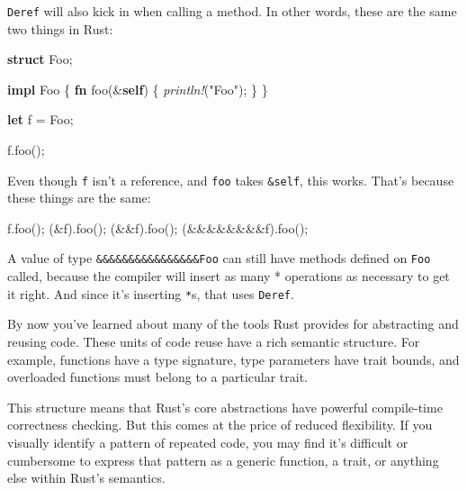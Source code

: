 \documentclass[a4paper,]{book}
\newenvironment{Shaded}{\begin{snugshade}}{\end{snugshade}}
\newcommand{\KeywordTok}[1]{\textcolor[rgb]{0.13,0.29,0.53}{\textbf{{#1}}}}
\newcommand{\StringTok}[1]{\textcolor[rgb]{0.31,0.60,0.02}{{#1}}}
\newcommand{\PreprocessorTok}[1]{\textcolor[rgb]{0.56,0.35,0.01}{\textit{{#1}}}}
\newcommand{\NormalTok}[1]{{#1}}
\begin{document}
\texttt{Deref} will also kick in when calling a method. In other words,
these are the same two things in Rust:

\begin{Shaded}
\begin{Highlighting}[]
\KeywordTok{struct} \NormalTok{Foo;}

\KeywordTok{impl} \NormalTok{Foo \{}
    \KeywordTok{fn} \NormalTok{foo(&}\KeywordTok{self}\NormalTok{) \{ }\PreprocessorTok{println!}\NormalTok{(}\StringTok{"Foo"}\NormalTok{); \}}
\NormalTok{\}}

\KeywordTok{let} \NormalTok{f = Foo;}

\NormalTok{f.foo();}
\end{Highlighting}
\end{Shaded}

Even though \texttt{f} isn't a reference, and \texttt{foo} takes
\texttt{\&self}, this works. That's because these things are the same:

\begin{Shaded}
\begin{Highlighting}[]
\NormalTok{f.foo();}
\NormalTok{(&f).foo();}
\NormalTok{(&&f).foo();}
\NormalTok{(&&&&&&&&f).foo();}
\end{Highlighting}
\end{Shaded}

A value of type \texttt{\&\&\&\&\&\&\&\&\&\&\&\&\&\&\&\&Foo} can still
have methods defined on \texttt{Foo} called, because the compiler will
insert as many * operations as necessary to get it right. And since it's
inserting \texttt{*}s, that uses \texttt{Deref}.


By now you've learned about many of the tools Rust provides for
abstracting and reusing code. These units of code reuse have a rich
semantic structure. For example, functions have a type signature, type
parameters have trait bounds, and overloaded functions must belong to a
particular trait.

This structure means that Rust's core abstractions have powerful
compile-time correctness checking. But this comes at the price of
reduced flexibility. If you visually identify a pattern of repeated
code, you may find it's difficult or cumbersome to express that pattern
as a generic function, a trait, or anything else within Rust's
semantics.
\end{document}
